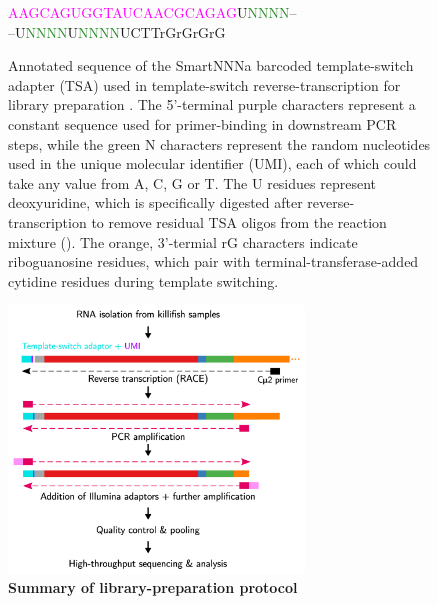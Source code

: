 \begin{figure}
\begin{center}
\LARGE
\textcolor{Fuchsia}{AAGCAGUGGTAUCAACGCAGAG}U\textcolor{ForestGreen}{NNNN}--\\--U\textcolor{ForestGreen}{NNNN}U\textcolor{ForestGreen}{NNNN}UCTT\textcolor{BurntOrange}{rGrGrGrG}
\end{center}
\caption{Annotated sequence of the SmartNNNa barcoded template-switch adapter (TSA) used in template-switch reverse-transcription for \igseq library preparation \parencite{turchaninova2016igprep}. The 5'-terminal purple characters represent a constant sequence used for primer-binding in downstream PCR steps, while the green N characters represent the random nucleotides used in the unique molecular identifier (UMI), each of which could take any value from A, C, G or T. The U residues represent deoxyuridine, which is specifically digested after reverse-transcription to remove residual TSA oligos from the reaction mixture (). The orange, 3'-termial rG characters indicate riboguanosine residues, which pair with terminal-transferase-added cytidine residues during template switching.}
\label{fig:igseq-tsa-sequence}
\end{figure}

\begin{figure}
\centering
\caption{\textbf{Summary of \igseq library-preparation protocol}}
\label{fig:igrace-pipeline}
\includegraphics[width=0.7\textwidth]{_Figures/png_edited/igrace-pipeline-narrow}
\vspace{0.5em}
\end{figure}

